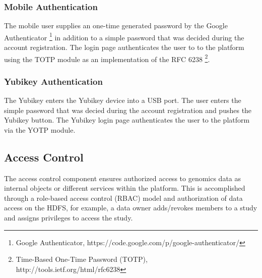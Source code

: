 \subsubsection {Mobile Authentication}
The mobile user supplies an one-time generated password by the Google Authenticator \footnote{Google Authenticator, https://code.google.com/p/google-authenticator/} in addition to a simple password that was decided during the account registration. The login page authenticates the user to to the platform using the TOTP module as an implementation of the RFC 6238 \footnote{Time-Based One-Time Password (TOTP), http://tools.ietf.org/html/rfc6238}.   

\subsubsection {Yubikey Authentication}
The Yubikey enters the Yubikey device into a USB port. The user enters the simple password that was decied during the account registration and pushes the Yubikey button. The Yubikey login page authenticates the user to the platform via the YOTP module.

\subsection {Access Control}
The access control component ensures authorized access to genomics data as internal objects or different services within the platform. This is accomplished through a role-based access control (RBAC) model and authorization of data access on the HDFS, for example, a data owner adds/revokes members to a study and assigns privileges to access the study.


